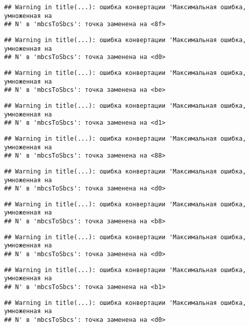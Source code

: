 \documentclass[
]{article}
\begin{document}
\begin{verbatim}
## Warning in title(...): ошибка конвертации 'Максимальная ошибка, умноженная на
## N' в 'mbcsToSbcs': точка заменена на <8f>
\end{verbatim}

\begin{verbatim}
## Warning in title(...): ошибка конвертации 'Максимальная ошибка, умноженная на
## N' в 'mbcsToSbcs': точка заменена на <d0>
\end{verbatim}

\begin{verbatim}
## Warning in title(...): ошибка конвертации 'Максимальная ошибка, умноженная на
## N' в 'mbcsToSbcs': точка заменена на <be>
\end{verbatim}

\begin{verbatim}
## Warning in title(...): ошибка конвертации 'Максимальная ошибка, умноженная на
## N' в 'mbcsToSbcs': точка заменена на <d1>
\end{verbatim}

\begin{verbatim}
## Warning in title(...): ошибка конвертации 'Максимальная ошибка, умноженная на
## N' в 'mbcsToSbcs': точка заменена на <88>
\end{verbatim}

\begin{verbatim}
## Warning in title(...): ошибка конвертации 'Максимальная ошибка, умноженная на
## N' в 'mbcsToSbcs': точка заменена на <d0>
\end{verbatim}

\begin{verbatim}
## Warning in title(...): ошибка конвертации 'Максимальная ошибка, умноженная на
## N' в 'mbcsToSbcs': точка заменена на <b8>
\end{verbatim}

\begin{verbatim}
## Warning in title(...): ошибка конвертации 'Максимальная ошибка, умноженная на
## N' в 'mbcsToSbcs': точка заменена на <d0>
\end{verbatim}

\begin{verbatim}
## Warning in title(...): ошибка конвертации 'Максимальная ошибка, умноженная на
## N' в 'mbcsToSbcs': точка заменена на <b1>
\end{verbatim}

\begin{verbatim}
## Warning in title(...): ошибка конвертации 'Максимальная ошибка, умноженная на
## N' в 'mbcsToSbcs': точка заменена на <d0>
\end{verbatim}
\end{document}
